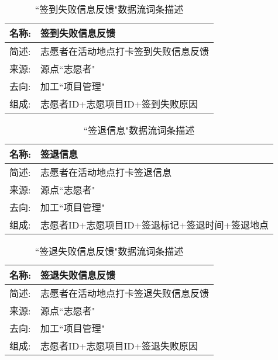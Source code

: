     \begin{table}[H]  
    \caption{``签到失败信息反馈"数据流词条描述}  
    \begin{center}  
        \begin{tabular}{l p{11cm}} 
            \hline
            \quad 名称: & 签到失败信息反馈 \\
            \hline
            \quad 简述: & 志愿者在活动地点打卡签到失败信息反馈 \\
            \hline
            \quad 来源: & 源点``志愿者" \\
            \hline
            \quad 去向: & 加工``项目管理"\\
            \hline
            \quad 组成: & 志愿者ID+志愿项目ID+签到失败原因  \\
            \hline
        \end{tabular}
        \label{tab1}
    \end{center}
    \end{table}

   \begin{table}[H]  
    \caption{``签退信息"数据流词条描述}  
    \begin{center}  
        \begin{tabular}{l p{11cm}} 
            \hline
            \quad 名称: & 签退信息 \\
            \hline
            \quad 简述: & 志愿者在活动地点打卡签退信息 \\
            \hline
            \quad 来源: & 源点``志愿者" \\
            \hline
            \quad 去向: & 加工``项目管理"\\
            \hline
            \quad 组成: & 志愿者ID+志愿项目ID+签退标记+签退时间+签退地点  \\
            \hline
        \end{tabular}
        \label{tab1}
    \end{center}
    \end{table}


    \begin{table}[H]  
    \caption{``签退失败信息反馈"数据流词条描述}  
    \begin{center}  
        \begin{tabular}{l p{11cm}} 
            \hline
            \quad 名称: & 签退失败信息反馈 \\
            \hline
            \quad 简述: & 志愿者在活动地点打卡签退失败信息反馈 \\
            \hline
            \quad 来源: & 源点``志愿者" \\
            \hline
            \quad 去向: & 加工``项目管理"\\
            \hline
            \quad 组成: & 志愿者ID+志愿项目ID+签退失败原因  \\
            \hline
        \end{tabular}
        \label{tab1}
    \end{center}
    \end{table}

